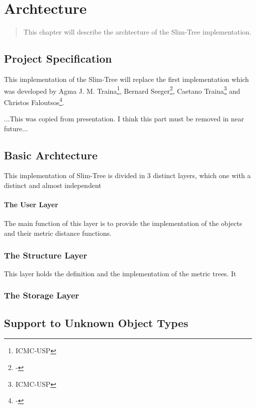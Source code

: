 
\chapter{Archtecture}

\begin{quote}
  This chapter will describe the archtecture of the Slim-Tree implementation.
\end{quote}

\section{Project Specification}

This implementation of the Slim-Tree will replace the first implementation which was
developed by 
Agma J. M. Traina\footnote{ICMC-USP},
Bernard Seeger\footnote{-},
Caetano Traina\footnote{ICMC-USP} and
Christos Faloutsos\footnote{-}. 

...This was copied from presentation. I think this part must be removed in near future...

\section{Basic Archtecture}

This implementation of Slim-Tree is divided in 3 distinct layers, which one with a distinct and
almost independent

\subsubsection{The User Layer}

The main function of this layer is to provide the implementation of the objects and their metric distance functions.


\subsection{The Structure Layer}

This layer holds the definition and the implementation of the metric trees. It

\subsection{The Storage Layer}

\section{Support to Unknown Object Types}